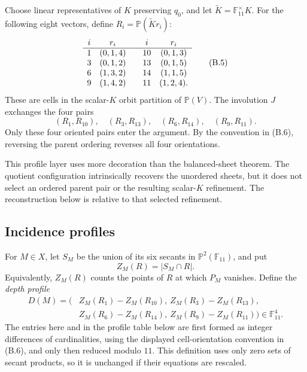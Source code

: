 \documentclass[11pt]{article}
\theoremstyle{definition}
\theoremstyle{remark}
\newcommand{\F}{\mathbb{F}}
\begin{document}
Choose linear representatives of \(K\) preserving \(q_0\), and let
\(\widetilde K=\F_{11}^{\times}K\).  For the following eight vectors,
define \(R_i=\mathbb P(\widetilde K r_i)\):
\[
\begin{array}{c@{\quad}c@{\qquad}c@{\quad}c}
i&r_i&i&r_i\\ \hline
1&(0,1,4)&10&(0,1,3)\\
3&(0,1,2)&13&(0,1,5)\\
6&(1,3,2)&14&(1,1,5)\\
9&(1,4,2)&11&(1,2,4).
\end{array}                                               \tag{B.5}
\]
These are cells in the scalar-\(K\) orbit partition of
\(\mathbb P(V)\).  The involution \(J\) exchanges the four pairs
\[
 (R_1,R_{10}),\quad (R_3,R_{13}),\quad
 (R_6,R_{14}),\quad (R_9,R_{11}).                         \tag{B.6}
\]
Only these four oriented pairs enter the argument.  By the convention in
(B.6), reversing the parent ordering reverses all four orientations.

This profile layer uses more decoration than the balanced-sheet theorem.
The quotient configuration intrinsically recovers the unordered sheets,
but it does not select an ordered parent pair or the resulting
scalar-\(K\) refinement.  The reconstruction below is relative to that
selected refinement.

\subsection{Incidence profiles}

For \(M\in X\), let \(S_M\) be the union of its six secants in
\(\mathbb P^2(\F_{11})\), and put
\[
 Z_M(R)=|S_M\cap R|.
\]
Equivalently, \(Z_M(R)\) counts the points of \(R\) at which \(P_M\)
vanishes.  Define the \emph{depth profile}
\[
 \begin{aligned}
 D(M)=\bigl(&Z_M(R_1)-Z_M(R_{10}),\
              Z_M(R_3)-Z_M(R_{13}),\\
            &Z_M(R_6)-Z_M(R_{14}),\
              Z_M(R_9)-Z_M(R_{11})\bigr)\in\F_{11}^4.
 \end{aligned}                                           \tag{B.7}
\]
The entries here and in the profile table below are first formed as
integer differences of cardinalities, using the displayed cell-orientation
convention in (B.6), and only then reduced modulo \(11\).
This definition uses only zero sets of secant products, so it is
unchanged if their equations are rescaled.
\end{document}

